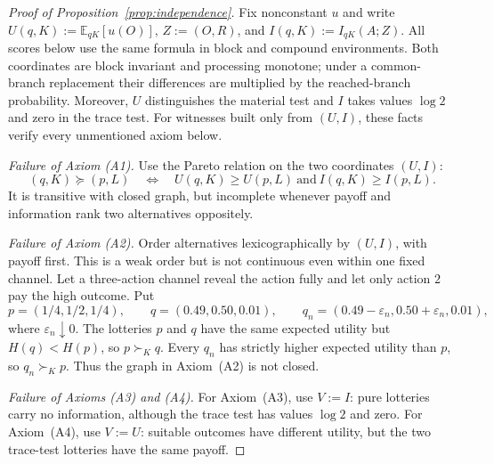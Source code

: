 \documentclass[11pt,a4paper]{article}
\theoremstyle{definition}
\newcommand{\E}{\mathbb E}
\newcommand{\I}{I}
\newcommand{\Sh}{H}
\newcommand{\1}{\mathbf 1}
\begin{document}
\begin{proof}[Proof of Proposition~\ref{prop:independence}]
Fix nonconstant $u$ and write $U(q,K):=\E_{qK}[u(O)]$, $Z:=(O,R)$, and
$I(q,K):=\I_{qK}(A;Z)$.  All scores below use the same formula in block and
compound environments.  Both coordinates are block invariant and processing
monotone; under a common-branch replacement their differences are multiplied
by the reached-branch probability.  Moreover, $U$ distinguishes the material
test and $I$ takes values $\log2$ and zero in the trace test.  For witnesses
built only from $(U,I)$, these facts verify every unmentioned axiom below.

\emph{Failure of Axiom \textup{(A1)}.}
Use the Pareto relation on the two coordinates $(U,I)$:
\[
 (q,K)\succeq(p,L)
 \quad\Longleftrightarrow\quad
 U(q,K)\ge U(p,L)\ \text{and}\ I(q,K)\ge I(p,L).
\]
It is transitive with closed graph, but incomplete whenever payoff and
information rank two alternatives oppositely.

\emph{Failure of Axiom \textup{(A2)}.}
Order alternatives lexicographically by $(U,I)$, with payoff first.  This is
a weak order but is not continuous even within one fixed channel.  Let a
three-action channel reveal the action fully and let only action $2$ pay the high outcome.  Put
\[
 p=(1/4,1/2,1/4),\qquad q=(0.49,0.50,0.01),\qquad
 q_n=(0.49-\varepsilon_n,0.50+\varepsilon_n,0.01),
\]
where $\varepsilon_n\downarrow0$.  The lotteries $p$ and $q$ have the same expected utility but
$\Sh(q)<\Sh(p)$, so $p\succ_Kq$.  Every $q_n$ has strictly higher expected utility than $p$, so
$q_n\succ_Kp$.  Thus the graph in Axiom~\textup{(A2)} is not closed.

\emph{Failure of Axioms \textup{(A3)} and \textup{(A4)}.}
For Axiom~\textup{(A3)}, use $V:=I$: pure lotteries carry no information,
although the trace test has values $\log2$ and zero.  For
Axiom~\textup{(A4)}, use $V:=U$: suitable outcomes have different utility,
but the two trace-test lotteries have the same payoff.


\end{proof}
\end{document}
